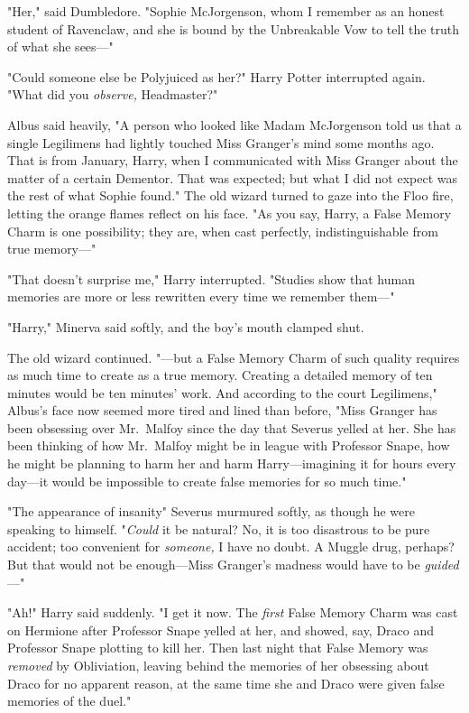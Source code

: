"Her," said Dumbledore. "Sophie McJorgenson, whom I remember as an honest
student of Ravenclaw, and she is bound by the Unbreakable Vow to tell the truth
of what she sees\mbox{---}"

"Could someone else be Polyjuiced as her?" Harry Potter interrupted again.
"What did you \emph{observe,} Headmaster?"

Albus said heavily, "A person who looked like Madam McJorgenson told us that a
single Legilimens had lightly touched Miss Granger's mind some months ago. That
is from January, Harry, when I communicated with Miss Granger about the matter
of a certain Dementor. That was expected; but what I did not expect was the
rest of what Sophie found." The old wizard turned to gaze into the Floo fire,
letting the orange flames reflect on his face. "As you say, Harry, a False
Memory Charm is one possibility; they are, when cast perfectly,
indistinguishable from true memory\mbox{---}"

"That doesn't surprise me," Harry interrupted. "Studies show that human
memories are more or less rewritten every time we remember them\mbox{---}"

"Harry," Minerva said softly, and the boy's mouth clamped shut.

The old wizard continued. "---but a False Memory Charm of such quality requires
as much time to create as a true memory. Creating a detailed memory of ten
minutes would be ten minutes' work. And according to the court Legilimens,"
Albus's face now seemed more tired and lined than before, "Miss Granger has
been obsessing over Mr.~Malfoy since the day that Severus{\el} yelled at
her. She has been thinking of how Mr.~Malfoy might be in league with Professor
Snape, how he might be planning to harm her and harm Harry---imagining it for
hours every day---it would be impossible to create false memories for so much
time."

"The appearance of insanity{\el}" Severus murmured softly, as though he were
speaking to himself. "\emph{Could} it be natural? No, it is too disastrous to
be pure accident; too convenient for \emph{someone,} I have no doubt. A Muggle
drug, perhaps? But that would not be enough---Miss Granger's madness would have
to be \emph{guided}\mbox{---}"

"Ah!" Harry said suddenly. "I get it now. The \emph{first} False Memory Charm
was cast on Hermione after Professor Snape yelled at her, and showed, say,
Draco and Professor Snape plotting to kill her. Then last night that False
Memory was \emph{removed} by Obliviation, leaving behind the memories of her
obsessing about Draco for no apparent reason, at the same time she and Draco
were given false memories of the duel."

